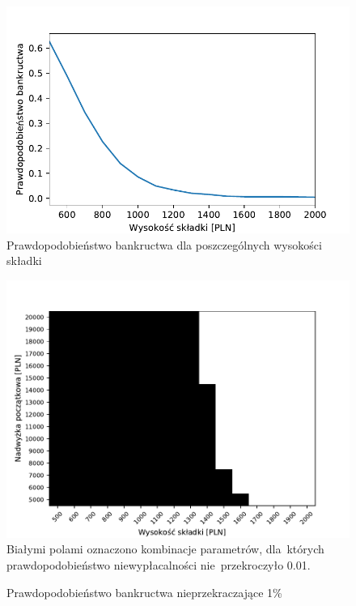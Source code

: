 \documentclass[12pt, a4paper, oneside]{mwart} %
\begin{document}
\begin{figure}
\centering
\caption{Prawdopodobieństwo bankructwa dla poszczególnych wysokości składki}
\label{p_bankructwa_n1000}
\includegraphics[width = \textwidth]{wykresy/p_bankructwa.pdf}
\end{figure}

\begin{figure}
\centering
\caption{Prawdopodobieństwo bankructwa nieprzekraczające 1\%}
\label{p_heatmapa_bankructwo_mniej_niz_0,01}
\includegraphics[width = \textwidth]{wykresy/p_heatmapa_bankructwo_mniej_niz_0,01.pdf}
\footnotesize Białymi polami oznaczono kombinacje parametrów, dla~których prawdopodobieństwo niewypłacalności nie~przekroczyło 0.01.
\end{figure}
\end{document}
